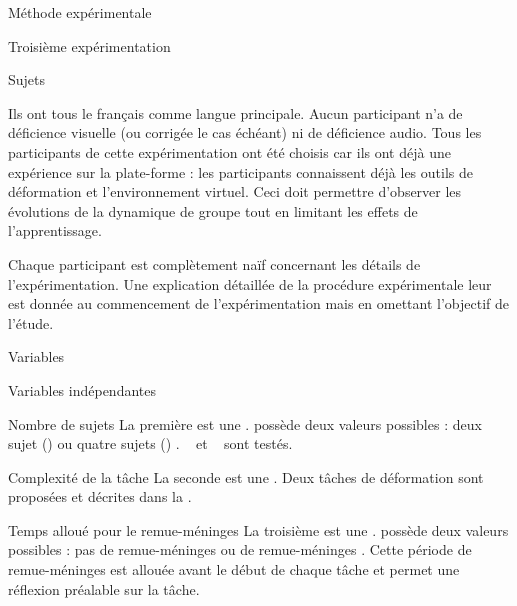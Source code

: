 \documentclass[myfrancais]{mythesis}
\begin{document}
\begin{mychapter}{Méthode expérimentale}
\begin{mysection}{Troisième expérimentation}
\begin{mysubsection}{Sujets}
\begin{itemize}
				\end{itemize}
				Ils ont tous le français comme langue principale.
				Aucun participant n'a de déficience visuelle (ou corrigée le cas échéant) ni de déficience audio.
				Tous les participants de cette expérimentation ont été choisis car ils ont déjà une expérience sur la plate-forme : les participants connaissent déjà les outils de déformation et l'environnement virtuel.
				Ceci doit permettre d'observer les évolutions de la dynamique de groupe tout en limitant les effets de l'apprentissage.

				Chaque participant est complètement naïf concernant les détails de l'expérimentation.
				Une explication détaillée de la procédure expérimentale leur est donnée au commencement de l'expérimentation mais en omettant l'objectif de l'étude.
			\end{mysubsection}
			\begin{mysubsection}{Variables}
				\begin{mysubsubsection}{Variables indépendantes}
					\begin{myparagraph}{ Nombre de sujets}
						La première  est une .
						 possède deux valeurs possibles : \og deux sujet (\mycf {}) \fg ou \og quatre sujets (\mycf {}) \fg.
						~ et ~ sont testés.
					\end{myparagraph}
					\begin{myparagraph}{ Complexité de la tâche}
						La seconde  est une .
						Deux tâches de déformation sont proposées et décrites dans la .
					\end{myparagraph}
					\begin{myparagraph}{ Temps alloué pour le remue-méninges}
						La troisième  est une .
						 possède deux valeurs possibles : \og pas de remue-méninges \fg ou \og {} de remue-méninges \fg.
						Cette période de remue-méninges est allouée avant le début de chaque tâche et permet une réflexion préalable sur la tâche.
					\end{myparagraph}

\end{mysubsubsection}
\end{mysubsection}
\end{mysection}
\end{mychapter}
\end{document}
